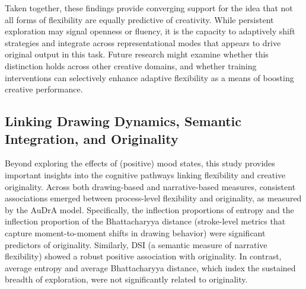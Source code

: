 \documentclass[../MA_Thesis.tex]{subfiles}
\begin{document}
Taken together, these findings provide converging support for the idea that not all forms of flexibility are equally predictive of creativity. While persistent exploration may signal openness or fluency, it is the capacity to adaptively shift strategies and integrate across representational modes that appears to drive original output in this task. Future research might examine whether this distinction holds across other creative domains, and whether training interventions can selectively enhance adaptive flexibility as a means of boosting creative performance.

\subsection*{Linking Drawing Dynamics, Semantic Integration, and Originality}
Beyond exploring the effects of (positive) mood states, this study provides important insights into the cognitive pathways linking flexibility and creative originality. Across both drawing-based and narrative-based measures, consistent associations emerged between process-level flexibility and originality, as measured by the AuDrA model. Specifically, the inflection proportions of entropy and the inflection proportion of the Bhattacharyya distance (stroke-level metrics that capture moment-to-moment shifts in drawing behavior) were significant predictors of originality. Similarly, DSI (a semantic measure of narrative flexibility) showed a robust positive association with originality. In contrast, average entropy and average Bhattacharyya distance, which index the sustained breadth of exploration, were not significantly related to originality. 
\end{document}
